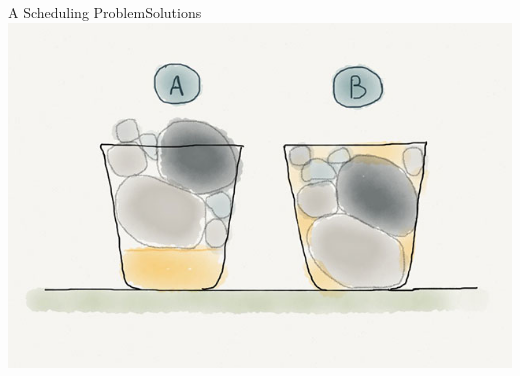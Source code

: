 \documentclass[10pt, compress, titleprogressbar, aspectratio=169]{beamer}
\begin{document}
        \begin{frame}{A Scheduling Problem}{Solutions}
            \vspace{1mm}
            \centering
            \includegraphics[width=\linewidth,height=\textheight,keepaspectratio]{./img/stones_and_sand.jpg}
        \end{frame}
\end{document}
